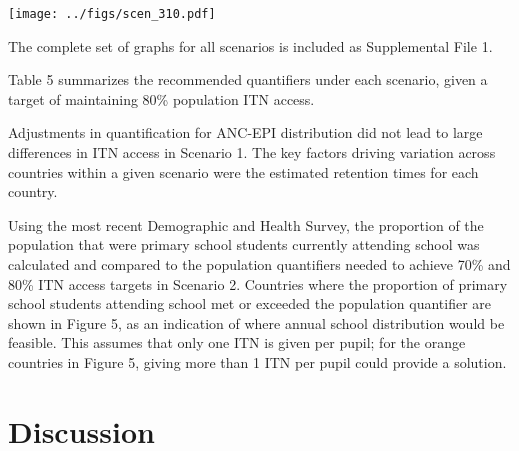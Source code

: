 \documentclass[review,
3p]{elsarticle} %
\begin{document}
\texttt{[image: ../figs/scen\_310.pdf]}

The complete set of graphs for all scenarios is included as Supplemental
File 1.

Table 5 summarizes the recommended quantifiers under each scenario,
given a target of maintaining 80\% population ITN access.

Adjustments in quantification for ANC-EPI distribution did not lead to
large differences in ITN access in Scenario 1. The key factors driving
variation across countries within a given scenario were the estimated
retention times for each country.

Using the most recent Demographic and Health Survey, the proportion of
the population that were primary school students currently attending
school was calculated and compared to the population quantifiers needed
to achieve 70\% and 80\% ITN access targets in Scenario 2. Countries
where the proportion of primary school students attending school met or
exceeded the population quantifier are shown in Figure 5, as an
indication of where annual school distribution would be feasible. This
assumes that only one ITN is given per pupil; for the orange countries
in Figure 5, giving more than 1 ITN per pupil could provide a solution.

\hypertarget{discussion}{%
\section{Discussion}\label{discussion}}
\end{document}
